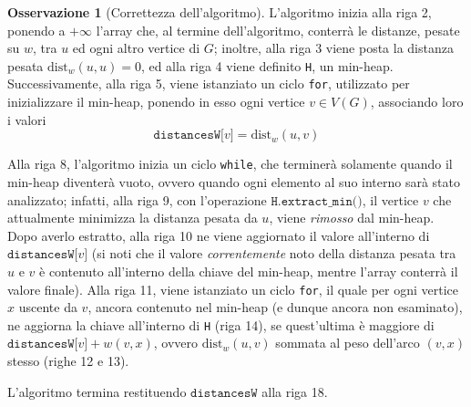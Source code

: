 \documentclass[14pt]{extreport}
\theoremstyle{definition}
\theoremstyle{definition}
\newtheorem{remark}{Osservazione}[subsection]
\begin{document}
\begin{remark}[Correttezza dell'algoritmo]
    L'algoritmo inizia alla riga 2, ponendo a $+ \infty$ l'array che, al termine dell'algoritmo, conterrà le distanze, pesate su $w$, tra $u$ ed ogni altro vertice di $G$; inoltre, alla riga 3 viene posta la distanza pesata $\mathrm{dist}_w(u, u) = 0$, ed alla riga 4 viene definito \texttt{H}, un min-heap. Successivamente, alla riga 5, viene istanziato un ciclo \texttt{for}, utilizzato per inizializzare il min-heap, ponendo in esso ogni vertice $v \in V(G)$, associando loro i valori $$\texttt{distancesW[}v\texttt{]} = \mathrm{dist}_w(u, v)$$

    Alla riga 8, l'algoritmo inizia un ciclo \texttt{while}, che terminerà solamente quando il min-heap diventerà vuoto, ovvero quando ogni elemento al suo interno sarà stato analizzato; infatti, alla riga 9, con l'operazione $\texttt{H.extract\_min()}$, il vertice $v$ che attualmente minimizza la distanza pesata da $u$, viene \textit{rimosso} dal min-heap. Dopo averlo estratto, alla riga 10 ne viene aggiornato il valore all'interno di $\texttt{distancesW[}v\texttt{]}$ (si noti che il valore \textit{correntemente} noto della distanza pesata tra $u$ e $v$ è contenuto all'interno della chiave del min-heap, mentre l'array conterrà il valore finale). Alla riga 11, viene istanziato un ciclo \texttt{for}, il quale per ogni vertice $x$ uscente da $v$, ancora contenuto nel min-heap (e dunque ancora non esaminato), ne aggiorna la chiave all'interno di \texttt{H} (riga 14), se quest'ultima è maggiore di $\texttt{distancesW[}v \texttt{]} + w(v, x)$, ovvero $\mathrm{dist}_w(u, v)$ sommata al peso dell'arco $(v, x)$ stesso (righe 12 e 13).

    L'algoritmo termina restituendo $\texttt{distancesW}$ alla riga 18.
\end{remark}
\end{document}
